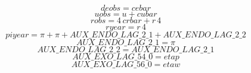 \begin{dmath}
{deobs}={cebar}
\end{dmath}
\begin{dmath}
{uobs}={{u}}+{cubar}
\end{dmath}
\begin{dmath}
{robs}=4\, {crbar}+{{r}}\, 4
\end{dmath}
\begin{dmath}
{ryear}={{r}}\, 4
\end{dmath}
\begin{dmath}
{piyear}={{\pi}}+{{\pi}}+{AUX\_ENDO\_LAG\_2\_1}+{AUX\_ENDO\_LAG\_2\_2}
\end{dmath}
\begin{dmath}
{AUX\_ENDO\_LAG\_2\_1}={{\pi}}
\end{dmath}
\begin{dmath}
{AUX\_ENDO\_LAG\_2\_2}={AUX\_ENDO\_LAG\_2\_1}
\end{dmath}
\begin{dmath}
{AUX\_EXO\_LAG\_54\_0}={etap}
\end{dmath}
\begin{dmath}
{AUX\_EXO\_LAG\_56\_0}={etaw}
\end{dmath}
